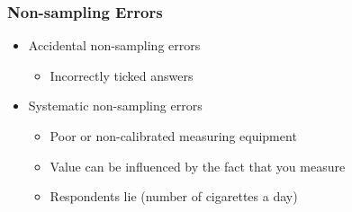 \documentclass[aspectratio=169]{beamer}
\begin{document}
\begin{frame}
  \frametitle{Non-sampling Errors}
  \begin{itemize}
    \item<+-> Accidental non-sampling errors
    \begin{itemize}
      \item Incorrectly ticked answers
    \end{itemize}
    \item<+-> Systematic non-sampling errors
    \begin{itemize}
      \item Poor or non-calibrated measuring equipment
      \item Value can be influenced by the fact that you measure
      \item Respondents lie (number of cigarettes a day)
    \end{itemize}
  \end{itemize}
\end{frame}
\end{document}
